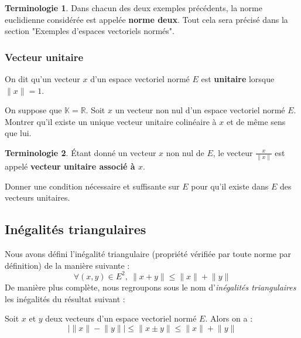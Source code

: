 \documentclass[french]{article}
\newcommand{\R}{\mathbb{R}}
\newcommand{\K}{\mathbb{K}}
\theoremstyle{plain}
\theoremstyle{definition}
\newtheorem*{terminologie}{Terminologie}
\theoremstyle{remark}
\begin{document}
\begin{terminologie}
	Dans chacun des deux exemples précédents, la norme euclidienne considérée est appelée \textbf{norme deux}. Tout cela sera précisé dans la section "Exemples d'espaces vectoriels normés".
\end{terminologie}

\subsubsection*{Vecteur unitaire}

\begin{dfn}
	On dit qu'un vecteur $x$ d'un espace vectoriel normé $E$ est \textbf{unitaire} lorsque $\lVert x\rVert=1$.
\end{dfn}

\begin{exo}[$\circ$]
	On suppose que $\K=\R$. Soit $x$ un vecteur non nul d'un espace vectoriel normé $E$. Montrer qu'il existe un unique vecteur unitaire colinéaire à $x$ et de même sens que lui.
\end{exo}

\begin{terminologie}
	Étant donné un vecteur $x$ non nul de $E$, le vecteur $\displaystyle\frac{x}{\lVert x\rVert}$ est appelé \textbf{vecteur unitaire associé à $x$}.
\end{terminologie}

\begin{exo}[$\circ$]
	Donner une condition nécessaire et suffisante sur $E$ pour qu'il existe dans $E$ des vecteurs unitaires.
\end{exo}


\subsection{Inégalités triangulaires}

Nous avons défini l'inégalité triangulaire (propriété vérifiée par toute norme par définition) de la manière suivante : $$\forall (x,y)\in E^2,\ \lVert x+y\rVert\leqslant\lVert x\rVert+\lVert y\rVert$$ De manière plus complète, nous regroupons sous le nom d'\textit{inégalités triangulaires} les inégalités du résultat suivant :

\begin{prop}%
	Soit $x$ et $y$ deux vecteurs d'un espace vectoriel normé $E$. Alors on a : $$\lvert \lVert x\rVert-\lVert y\rVert\rvert\leqslant\lVert x\pm y\rVert\leqslant\lVert x\rVert+\lVert y\rVert$$
\end{prop}
\end{document}

